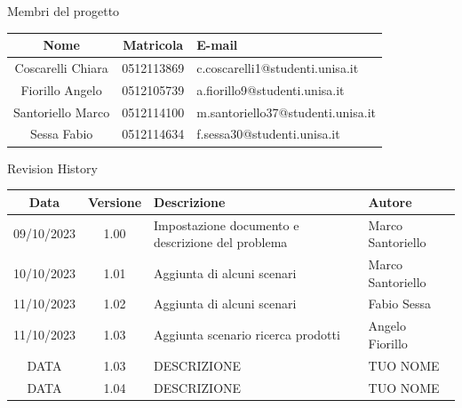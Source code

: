 \documentclass[12pt, a4paper, oneside]{book}
\begin{document}
    \newpage
    \begin{center}
    {\LARGE{Membri del progetto}}
    \end{center}
    \begin{center}
        \begin{tabular}{|c|c|m{8cm}|}
            \hline
            \cellcolor{lightgray} \textbf{Nome} & \cellcolor{lightgray} \textbf{Matricola} & \cellcolor{lightgray} \textbf{E-mail}\\ \hline
            Coscarelli  Chiara & 0512113869 & c.coscarelli1@studenti.unisa.it\\ \hline
            Fiorillo Angelo & 0512105739 & a.fiorillo9@studenti.unisa.it\\ \hline
            Santoriello Marco &  0512114100 & m.santoriello37@studenti.unisa.it\\ \hline
            Sessa Fabio & 0512114634 & f.sessa30@studenti.unisa.it\\ \hline
        \end{tabular}
    \end{center}

    \begin{center}
    {\LARGE{Revision History}}
    \end{center}

    \begin{center}
        \begin{tabular}{|c|c|m{8cm}|m{3.5cm}|}
            \hline
            \cellcolor{lightgray} \textbf{Data} & \cellcolor{lightgray} \textbf{Versione} & \cellcolor{lightgray} \textbf{Descrizione} & \cellcolor{lightgray} \textbf{Autore}\\ \hline
            09/10/2023 & 1.00 & Impostazione documento e descrizione del problema & Marco Santoriello\\ \hline
            10/10/2023 & 1.01 & Aggiunta di alcuni scenari & Marco Santoriello\\ \hline
            11/10/2023 & 1.02 & Aggiunta di alcuni scenari & Fabio Sessa\\ \hline
            11/10/2023 & 1.03 & Aggiunta scenario ricerca prodotti & Angelo Fiorillo\\ \hline
            DATA & 1.03 & DESCRIZIONE & TUO NOME\\ \hline
            DATA & 1.04 & DESCRIZIONE & TUO NOME\\ \hline
        \end{tabular}
    \end{center}
\end{document}
